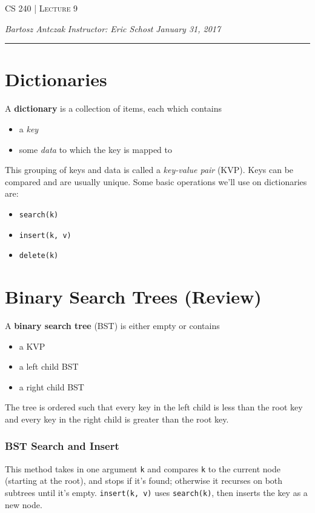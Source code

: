 \documentclass{report}
\newcommand{\lectureNum}{9}
\newcommand{\curDate}{January 31, 2017}
\newcommand{\course}{CS 240}
\begin{document}
\begin{center}
\begin{Large}
\textsc{\course{} | Lecture \lectureNum{}}
\end{Large}
\end{center} 
\noindent \textit{Bartosz Antczak} \hfill
\textit{Instructor: Eric Schost} \hfill
\textit{\curDate{}}
\rule{\textwidth}{0.4pt}

\section{Dictionaries}
A \textbf{dictionary} is a collection of items, each which contains
\begin{itemize}
\item a \textit{key}
\item some \textit{data} to which the key is mapped to
\end{itemize}
This grouping of keys and data is called a \textit{key-value pair} (KVP). Keys can be compared and are usually unique. Some basic operations we'll use on dictionaries are:
\begin{itemize}
\item \texttt{search(k)}
\item \texttt{insert(k, v)}
\item \texttt{delete(k)}
\end{itemize}
\section{Binary Search Trees (Review)}
A \textbf{binary search tree} (BST) is either empty or contains
\begin{itemize}
\item a KVP
\item a left child BST
\item a right child BST
\end{itemize}
The tree is ordered such that every key in the left child is less than the root key and every key in the right child is greater than the root key.
\subsubsection{BST Search and Insert}
This method takes in one argument \texttt{k} and compares \texttt{k} to the current node (starting at the root), and stops if it's found; otherwise it recurses on both subtrees until it's empty. \texttt{insert(k, v)} uses \texttt{search(k)}, then inserts the key as a new node.
\end{document}
